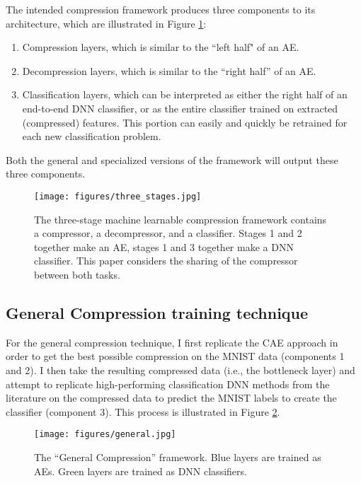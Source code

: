 \documentclass[twoside,11pt]{article}
\begin{document}
The intended compression framework produces three components to its architecture, which are
 illustrated in Figure \ref{fig:three_stages}:
\begin{enumerate}
    \item Compression layers, which is similar to the ``left half" of an AE. 
    \item Decompression layers, which is similar to the “right half” of an AE. 
    \item Classification layers, which can be interpreted as either the right half of
     an end-to-end DNN classifier, or as the entire classifier trained on extracted (compressed) features. This portion can easily and quickly be retrained for each new classification problem.
\end{enumerate}

Both the general and specialized versions of the framework will output these three components.

\begin{figure}
  \texttt{[image: figures/three\_stages.jpg]}
  \caption{The three-stage machine learnable compression framework contains a compressor, a decompressor, and a classifier. Stages 1 and 2 together make an AE, stages 1 and 3 together make a DNN classifier. This paper considers the sharing of the compressor between both tasks. }
  \label{fig:three_stages}
\end{figure}

\subsection{General Compression training technique} \label{general}

For the general compression technique, I first replicate the CAE approach in order 
to get the best possible compression on the MNIST data (components 1 and 2). 
I then take the resulting compressed data (i.e., the bottleneck layer) and attempt 
to replicate high-performing classification DNN methods from the literature on 
the compressed data to predict the MNIST labels to create the classifier (component 3).
This process is illustrated in Figure \ref{fig:general}.

\begin{figure}
  \texttt{[image: figures/general.jpg]}
  \caption{The “General Compression” framework. Blue layers are trained as AEs. Green layers are trained as DNN classifiers.}
  \label{fig:general}
\end{figure}
\end{document}
